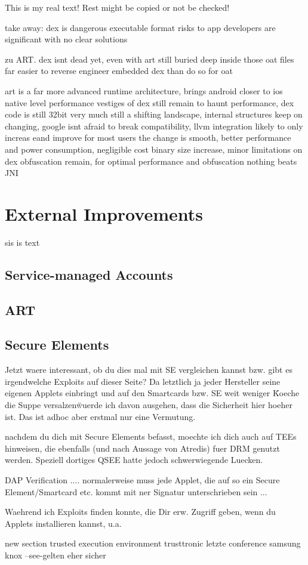 This is my real text! Rest might be copied or not be checked!

%
take away:
dex is dangerous executable format
risks to app developers are significant with no clear solutions

zu ART.
dex isnt dead yet, even with art
still buried deep inside those oat files
far easier to reverse engineer embedded dex than do so for oat

art is a far more advanced runtime architecture, brings android closer to ios native level performance
vestiges of dex still remain to haunt performance, dex code is still 32bit
very much still a shifting landscape, internal structures keep on changing, google isnt afraid to break compatibility, llvm integration likely to only increas eand improve
for most users the change is smooth, better performance and power consumption, negligible cost binary size increase, minor limitations on dex obfuscation remain, for optimal performance and obfuscation nothing beats JNI
\cite{andevconDalvikART}
%

\section{External Improvements} \label{section:evaluation-setion}
sis is text
\subsection{Service-managed Accounts}
\subsection{ART}
\subsection{Secure Elements}
Jetzt waere interessant, ob du dies mal mit SE vergleichen kannst bzw. gibt es irgendwelche Exploits auf dieser Seite? Da letztlich ja jeder Hersteller seine eigenen Applets einbringt und auf den Smartcards bzw. SE weit weniger \"Koeche die Suppe versalzen\" wuerde ich davon ausgehen, dass die Sicherheit hier hoeher ist. Das ist adhoc aber erstmal nur eine Vermutung.



nachdem du dich mit Secure Elements befasst, moechte ich dich auch auf TEEs hinweisen, die ebenfalls (und nach Aussage von Atredis) fuer DRM genutzt werden. Speziell dortiges QSEE hatte jedoch schwerwiegende Luecken.

DAP Verification .... normalerweise muss jede Applet, die auf so ein Secure Element/Smartcard etc. kommt mit ner Signatur unterschrieben sein ...


Waehrend ich Exploits finden konnte, die Dir erw. Zugriff geben, wenn du Applets installieren kannst, u.a.



new section trusted execution environment
trusttronic letzte conference
samsung knox
--see-gelten eher sicher
